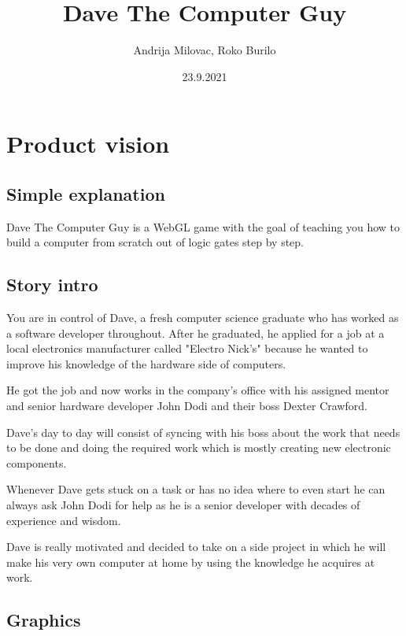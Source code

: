 \documentclass[12pt]{article}
\author{Andrija Milovac, Roko Burilo}
\title{Dave The Computer Guy}
\date{23.9.2021}
\begin{document}
\maketitle
\tableofcontents
\section{Product vision}
\subsection{Simple explanation}
Dave The Computer Guy is a WebGL game with the goal of teaching you how to build a computer from scratch out of logic gates step by step.
\subsection{Story intro}

You are in control of Dave, a fresh computer science graduate who has worked as a software developer throughout.
After he graduated, he applied for a job at a local electronics manufacturer called "Electro Nick's" because he wanted to 
improve his knowledge of the hardware side of computers.

He got the job and now works in the company's office with his assigned mentor and senior hardware developer John Dodi and their boss Dexter Crawford.

Dave's day to day will consist of syncing with his boss about the work that needs to be done and doing the required work which is mostly
creating new electronic components.

Whenever Dave gets stuck on a task or has no idea where to even start he can always ask John Dodi for help as he is a senior developer with
decades of experience and wisdom.

Dave is really motivated and decided to take on a side project in which he will make his very own computer at home by using the knowledge 
he acquires at work.
\subsection{Graphics}
\end{document}
